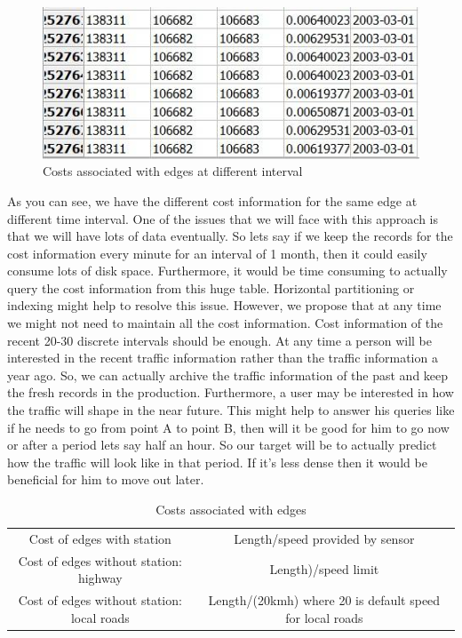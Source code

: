 \documentclass[a4paper,12pt, notitlepage, oneside, onecolumn]{article}
\begin{document}
\begin{figure}[H]
\begin{minipage}[b]{1.0\linewidth}
\centering
\includegraphics[scale=0.6]{edge_interval_cost.jpg}
\caption{Costs associated with edges at different interval}
\label{fig:edge_interval_cost}
\end{minipage}
\centering
\end{figure}

As you can see, we have the different cost information for the same edge at different time interval. One of the issues that we will face with this approach is that we will have lots of data eventually. So lets say  if we keep the records for the cost information every minute for an interval of 1 month, then it could easily consume lots of disk space. Furthermore, it would be time consuming to actually query the cost information from this huge table. Horizontal partitioning or indexing might help to resolve this issue. However, we propose that at any time we might not need to maintain all the cost information. Cost information of the recent 20-30 discrete intervals should be enough. At any time a person will be interested in the recent traffic information rather than the traffic information a year ago. So, we can actually archive the traffic information of the past and keep the fresh records in the production. Furthermore, a user may be interested in how the traffic will shape in the near future. This might help to answer his queries like if he needs to go from point A to point B, then will it be good for him to go now or after a period lets say half an hour. So our target will be to actually predict how the traffic will look like in that period. If it's less dense then it would be beneficial for him to move out later.\\

\small
\begin{table}[H]
\caption{Costs associated with edges}
\centering
\begin{tabular}{|>{\tiny}c |>{\tiny} c }
\hline
Cost of edges with station & Length/speed provided by sensor\\
Cost of edges without station: highway & Length)/speed limit\\
Cost of edges without station: local roads & Length/(20kmh) where 20 is default speed for local roads\\
\hline
\end{tabular}
\label{table:nonlin}
\end{table}
\end{document}
